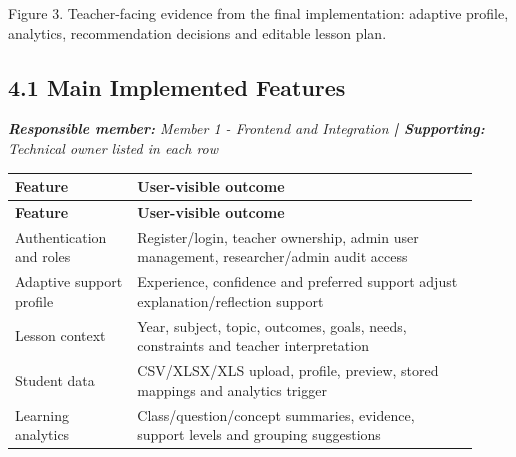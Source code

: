 \documentclass[11pt,a4paper]{article}
\begin{document}
Figure 3. Teacher-facing evidence from the final implementation: adaptive profile, analytics, recommendation decisions and editable lesson plan.\par

\subsection*{4.1 Main Implemented Features}


\noindent\textit{\textbf{Responsible member: }Member 1 - Frontend and Integration\textbf{ | Supporting: }Technical owner listed in each row}\par

\begin{small}

\setlength{\tabcolsep}{3pt}

\begin{longtable}{>{\raggedright\arraybackslash}p{0.246\linewidth}>{\raggedright\arraybackslash}p{0.674\linewidth}}

\hline

\textbf{Feature} & \textbf{User-visible outcome} \\ \hline

\endfirsthead

\hline

\textbf{Feature} & \textbf{User-visible outcome} \\ \hline

\endhead

Authentication and roles & Register/\allowbreak{}login, teacher ownership, admin user management, researcher/\allowbreak{}admin audit access \\ \hline

Adaptive support profile & Experience, confidence and preferred support adjust explanation/\allowbreak{}reflection support \\ \hline

Lesson context & Year, subject, topic, outcomes, goals, needs, constraints and teacher interpretation \\ \hline

Student data & CSV/\allowbreak{}XLSX/\allowbreak{}XLS upload, profile, preview, stored mappings and analytics trigger \\ \hline

Learning analytics & Class/\allowbreak{}question/\allowbreak{}concept summaries, evidence, support levels and grouping suggestions \\ \hline


\end{longtable}
\end{small}
\end{document}
